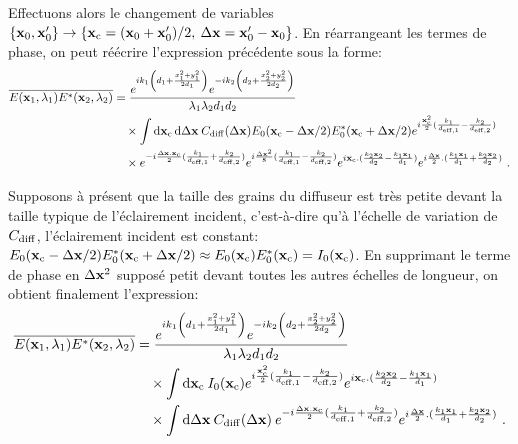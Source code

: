 Effectuons alors le changement de variables $\lbrace \mathbf{x}_0,\mathbf{x}_0' \rbrace\rightarrow \lbrace \mathbf{x}_{\mathrm{c}}=(\mathbf{x}_0+\mathbf{x}_0')/2 ,\: \Delta\mathbf{x}=\mathbf{x}_0'-\mathbf{x}_0 \rbrace$. En réarrangeant les termes de phase, on peut réécrire l'expression précédente sous la forme:
\begin{align}
\overline{E(\mathbf{x}_1,\lambda_1)E^*(\mathbf{x}_2,\lambda_2)} &= \frac{e^{ik_1\left( d_1 + \frac{x_1^2+y_1^2}{2d_1} \right)} e^{-ik_2 \left( d_2 + \frac{x_2^2+y_2^2}{2d_2}\right)}}{\lambda_1 \lambda_2 d_1 d_2} \\
\nonumber & \quad \times \int{\mathop{}\mathopen{}\mathrm{d}\mathbf{x}_{\mathrm{c}}\mathop{}\mathopen{}\mathrm{d}\Delta\mathbf{x}\: C_{\mathrm{diff}}(\Delta\mathbf{x}) E_0(\mathbf{x}_{\mathrm{c}}-\Delta\mathbf{x}/2)E_0^*(\mathbf{x}_{\mathrm{c}}+\Delta\mathbf{x}/2)} e^{i\frac{\mathbf{x}_{\mathrm{c}}^2}{2} (\frac{k_1}{d_{\mathrm{eff,1}}} - \frac{k_2}{d_{\mathrm{eff,2}}})}\\
\nonumber & \quad \times  e^{-i \frac{\Delta\mathbf{x} . \mathbf{x}_{\mathrm{c}}}{2} ( \frac{k_1}{d_{\mathrm{eff,1}}} + \frac{k_2}{d_{\mathrm{eff,2}}})} e^{i \frac{\Delta\mathbf{x}^2}{8}(\frac{k_1}{d_{\mathrm{eff,1}}} - \frac{k_2}{d_{\mathrm{eff,2}}})} e^{i\mathbf{x}_{\mathrm{c}}.(\frac{k_2 \mathbf{x}_2}{d_2} - \frac{k_1 \mathbf{x}_1}{d_1})} e^{i\frac{\Delta\mathbf{x}}{2} . (\frac{k_1 \mathbf{x}_1}{d_1} + \frac{k_2 \mathbf{x}_2}{d_2})} \text{ .}
\end{align}

Supposons à présent que la taille des grains du diffuseur est très petite devant la taille typique de l'éclairement incident, c'est-à-dire qu'à l'échelle de variation de $C_{\mathrm{diff}}$, l'éclairement incident est constant: $E_0(\mathbf{x}_{\mathrm{c}}-\Delta\mathbf{x}/2) E_0^*(\mathbf{x}_{\mathrm{c}}+\Delta\mathbf{x}/2) \approx E_0(\mathbf{x}_{\mathrm{c}}) E_0^*(\mathbf{x}_{\mathrm{c}}) = I_0(\mathbf{x}_{\mathrm{c}})$. En supprimant le terme de phase en $\Delta\mathbf{x}^2$ supposé petit devant toutes les autres échelles de longueur, on obtient finalement l'expression:
\begin{align}
\overline{E(\mathbf{x}_1,\lambda_1)E^*(\mathbf{x}_2,\lambda_2)} &= \frac{e^{ik_1\left( d_1 + \frac{x_1^2+y_1^2}{2d_1} \right)} e^{-ik_2 \left( d_2 + \frac{x_2^2+y_2^2}{2d_2}\right)}}{\lambda_1 \lambda_2 d_1 d_2} \\
\nonumber & \quad \times \int{\mathop{}\mathopen{}\mathrm{d}\mathbf{x}_{\mathrm{c}}\: I_0(\mathbf{x}_{\mathrm{c}}) e^{i\frac{\mathbf{x}_{\mathrm{c}}^2}{2}(\frac{k_1}{d_{\mathrm{eff,1}}} - \frac{k_2}{d_{\mathrm{eff,2}}})} e^{i \mathbf{x}_{\mathrm{c}}. (\frac{k_2 \mathbf{x}_2}{d_2}-\frac{k_1 \mathbf{x}_1}{d_1})}} \\
\nonumber & \quad \times \int{\mathop{}\mathopen{}\mathrm{d}\Delta\mathbf{x}\: C_{\mathrm{diff}}(\Delta\mathbf{x}) \: e^{-i\frac{\Delta\mathbf{x}. \mathbf{x}_{\mathrm{c}}}{2}(\frac{k_1}{d_{\mathrm{eff,1}}} + \frac{k_2}{d_{\mathrm{eff,2}}})} e^{i\frac{\Delta\mathbf{x}}{2}. (\frac{k_1 \mathbf{x}_1}{d_1} +\frac{k_2 \mathbf{x}_2}{d_2})}} \text{ .}
\label{eq:fonction_correlation_generale}
\end{align}

